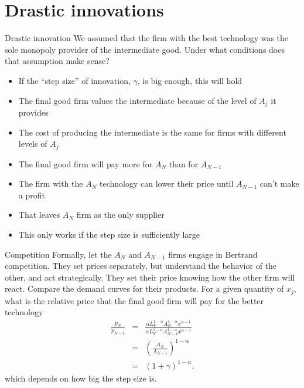 \section{Drastic innovations}
\begin{frame}{Drastic innovation}
We assumed that the firm with the best technology was the sole monopoly provider of the intermediate good. Under what conditions does that assumption make sense?
\begin{itemize}
	\item If the ``step size'' of innovation, $\gamma$, is big enough, this will hold
	\item The final good firm values the intermediate because of the level of $A_j$ it provides
	\item The cost of producing the intermediate is the same for firms with different levels of $A_j$
	\item The final good firm will pay more for $A_N$ than for $A_{N-1}$
	\item The firm with the $A_N$ technology can lower their price until $A_{N-1}$ can't make a profit
	\item That leaves $A_N$ firm as the only supplier
	\item This only works if the step size is sufficiently large
\end{itemize}

\end{frame}

\begin{frame}{Competition}
Formally, let the $A_N$ and $A_{N-1}$ firms engage in Bertrand competition. They set prices separately, but understand the behavior of the other, and act strategically. They set their price knowing how the other firm will react. 
\vspace{.25in}\noindent Compare the demand curves for their products. For a given quantity of $x_j$, what is the relative price that the final good firm will pay for the better technology
\begin{eqnarray}
	\frac{p_N}{p_{N-1}} &=& \frac{\alpha L_Y^{1-\alpha} A_N^{1-\alpha} x^{\alpha-1}}{\alpha L_Y^{1-\alpha} A_{N-1}^{1-\alpha} x^{\alpha-1}} \nonumber \\ 
	&=& \left(\frac{A_N}{A_{N-1}}\right)^{1-\alpha} \nonumber \\ 
	&=& (1+\gamma)^{1-\alpha}. \nonumber
\end{eqnarray}
which depends on how big the step size is. 
\end{frame}


